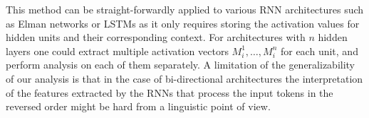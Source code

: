 This method can be straight-forwardly applied to various 
RNN architectures such as Elman networks or LSTMs 
as it only requires storing the activation values for hidden units and 
their corresponding context. For architectures with $n$ hidden layers
one could extract multiple activation vectors $M_i^{1}, \ldots, M_i^{n}$
for each unit, and perform analysis on each of them separately.
A limitation of the generalizability of our analysis is that in the case of 
bi-directional architectures the interpretation of the features
extracted by the RNNs that process the input tokens in the reversed order
might be hard from a linguistic point of view. 



%
%

